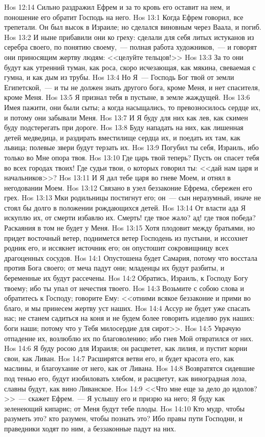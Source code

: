 \vs Hos 12:14 Сильно раздражил Ефрем  и за то кровь его оставит на нем, и поношение его обратит Господь на него.
\vs Hos 13:1 Когда Ефрем говорил, все трепетали. Он был высок в Израиле; но сделался виновным через Ваала, и погиб.
\vs Hos 13:2 И ныне прибавили они ко греху: сделали для себя литых истуканов из серебра своего, по понятию своему,~--- полная работа художников,~--- и говорят они приносящим жертву людям: <<целуйте тельцов!>>
\vs Hos 13:3 За то они будут как утренний туман, как роса, скоро исчезающая, как мякина, свеваемая с гумна, и как дым из трубы.
\vs Hos 13:4 Но Я~--- Господь Бог твой от земли Египетской,~--- и ты не должен знать другого бога, кроме Меня, и нет спасителя, кроме Меня.
\vs Hos 13:5 Я признал тебя в пустыне, в земле жаждущей.
\vs Hos 13:6 Имея пажити, они были сыты; а когда насыщались, то превозносилось сердце их, и потому они забывали Меня.
\vs Hos 13:7 И Я буду для них как лев, как скимен буду подстерегать при дороге.
\vs Hos 13:8 Буду нападать на них, как лишенная детей медведица, и раздирать вместилище сердца их, и поедать их там, как львица; полевые звери будут терзать их.
\vs Hos 13:9 Погубил ты себя, Израиль, ибо только во Мне опора твоя.
\vs Hos 13:10 Где царь твой теперь? Пусть он спасет тебя во всех городах твоих! Где судьи твои, о которых говорил ты: <<дай нам царя и начальников>>?
\vs Hos 13:11 И Я дал тебе царя во гневе Моем, и отнял в негодовании Моем.
\vs Hos 13:12 Связано в узел беззаконие Ефрема, сбережен его грех.
\vs Hos 13:13 Мки родильницы постигнут его; он~--- сын неразумный, иначе не стоял бы долго в положении рождающихся детей.
\vs Hos 13:14 От власти ада Я искуплю их, от смерти избавлю их. Смерть! где твое жало? ад! где твоя победа? Раскаяния в том не будет у Меня.
\vs Hos 13:15 Хотя  плодовит между братьями, но придет восточный ветер, поднимется ветер Господень из пустыни, и иссохнет родник его, и иссякнет источник его; он опустошит сокровищницу всех драгоценных сосудов.
\vs Hos 14:1 Опустошена будет Самария, потому что восстала против Бога своего; от меча падут они; младенцы их будут разбиты, и беременные их будут рассечены.
\vs Hos 14:2 Обратись, Израиль, к Господу Богу твоему; ибо ты упал от нечестия твоего.
\vs Hos 14:3 Возьмите с собою  слова и обратитесь к Господу; говорите Ему: <<отними всякое беззаконие и прими во благо, и мы принесем жертву уст наших.
\vs Hos 14:4 Ассур не будет уже спасать нас; не станем садиться на коня и не будем более говорить изделию рук наших: боги наши; потому что у Тебя милосердие для сирот>>.
\vs Hos 14:5 Уврачую отпадение их, возлюблю их по благоволению; ибо гнев Мой отвратился от них.
\vs Hos 14:6 Я буду росою для Израиля; он расцветет, как лилия, и пустит корни свои, как Ливан.
\vs Hos 14:7 Расширятся ветви его, и будет красота его, как маслины, и благоухание от него, как от Ливана.
\vs Hos 14:8 Возвратятся сидевшие под тенью его, будут изобиловать хлебом, и расцветут, как виноградная лоза, славны будут, как вино Ливанское.
\vs Hos 14:9 <<Что мне еще за дело до идолов?>>~--- скажет Ефрем.~--- Я услышу его и призрю на него; Я буду как зеленеющий кипарис; от Меня будут тебе плоды.
\vs Hos 14:10 Кто мудр, чтобы разуметь это? кто разумен, чтобы познать это? Ибо правы пути Господни, и праведники ходят по ним, а беззаконные падут на них.
